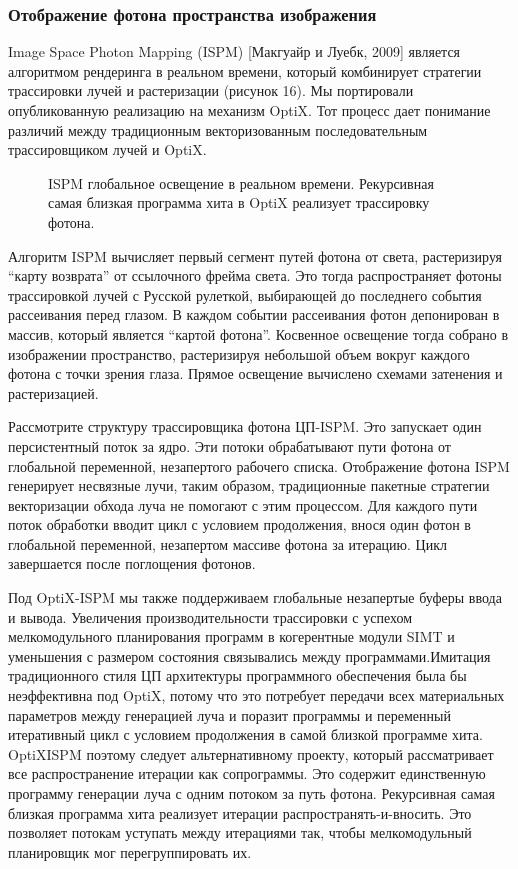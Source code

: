 \subsubsection{Отображение фотона пространства изображения}
Image Space Photon Mapping (ISPM) [Макгуайр и Луебк, 2009] является алгоритмом рендеринга в реальном времени, который комбинирует стратегии трассировки лучей и растеризации (рисунок 16). Мы портировали опубликованную реализацию на механизм OptiX. Тот процесс дает понимание различий между традиционным векторизованным последовательным трассировщиком лучей и OptiX.
\begin{figure}[h!]
\caption{ISPM глобальное освещение в реальном времени. Рекурсивная самая близкая программа хита в OptiX реализует трассировку фотона.}
\label{fig6}
\end{figure}
Алгоритм ISPM вычисляет первый сегмент путей фотона от света, растеризируя “карту возврата” от ссылочного фрейма света. Это тогда распространяет фотоны трассировкой лучей с Русской рулеткой, выбирающей до последнего события рассеивания перед глазом. В каждом событии рассеивания фотон депонирован в массив, который является “картой фотона”. Косвенное освещение тогда собрано в изображении пространство, растеризируя небольшой объем вокруг каждого фотона с точки зрения глаза. Прямое освещение вычислено схемами затенения и растеризацией.

Рассмотрите структуру трассировщика фотона ЦП-ISPM. Это запускает один персистентный поток за ядро. Эти потоки обрабатывают пути фотона от глобальной переменной, незапертого рабочего списка. Отображение фотона ISPM генерирует несвязные лучи, таким образом, традиционные пакетные стратегии векторизации обхода луча не помогают с этим процессом. Для каждого пути поток обработки вводит цикл с условием продолжения, внося один фотон в глобальной переменной, незапертом массиве фотона за итерацию. Цикл завершается после поглощения фотонов.

Под OptiX-ISPM мы также поддерживаем глобальные незапертые буферы ввода и вывода. Увеличения производительности трассировки с успехом мелкомодульного планирования программ в когерентные модули SIMT и уменьшения с размером состояния связывались между программами.Имитация традиционного стиля ЦП архитектуры программного обеспечения была бы неэффективна под OptiX, потому что это потребует передачи всех материальных параметров между генерацией луча и поразит программы и переменный итеративный цикл с условием продолжения в самой близкой программе хита. OptiXISPM поэтому следует альтернативному проекту, который рассматривает все распространение итерации как сопрограммы. Это содержит единственную программу генерации луча с одним потоком за путь фотона. Рекурсивная самая близкая программа хита реализует итерации распространять-и-вносить. Это позволяет потокам уступать между итерациями так, чтобы мелкомодульный планировщик мог перегруппировать их. 

